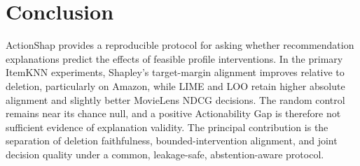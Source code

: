 \documentclass[pdflatex,sn-basic,Numbered]{sn-jnl}
\begin{document}
\section{Conclusion}
ActionShap provides a reproducible protocol for asking whether recommendation explanations predict the effects of feasible profile interventions. In the primary ItemKNN experiments, Shapley’s target-margin alignment improves relative to deletion, particularly on Amazon, while LIME and LOO retain higher absolute alignment and slightly better MovieLens NDCG decisions. The random control remains near its chance null, and a positive Actionability Gap is therefore not sufficient evidence of explanation validity. The principal contribution is the separation of deletion faithfulness, bounded-intervention alignment, and joint decision quality under a common, leakage-safe, abstention-aware protocol.
\end{document}
